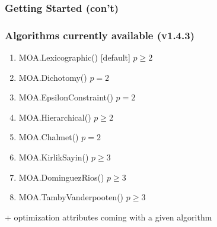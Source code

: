 \documentclass[]{beamer}
\begin{document}
\begin{frame}
  \frametitle{Getting Started (con't)}
\vspace{3mm}

\begin{center}
\end{center}

\end{frame}

% 
%

\begin{frame}
  \frametitle{Algorithms currently available (v1.4.3)}


\begin{enumerate}
\item     MOA.Lexicographic() [default]  \hfill $p \ge 2$
\item     MOA.Dichotomy()   \hfill $p=2$
\item     MOA.EpsilonConstraint() \hfill $p=2$

\medskip

\item     MOA.Hierarchical() \hfill $p \ge 2$
\item     MOA.Chalmet() \hfill $p=2$

\pause
\medskip

\item     MOA.KirlikSayin() \hfill $p \ge 3$
\item     MOA.DominguezRios() \hfill $p \ge 3$
\item     MOA.TambyVanderpooten() \hfill $p \ge 3$
\end{enumerate}
\vspace{6mm}
\pause

\noindent
{+ optimization attributes coming with a given algorithm}

\end{frame}
\end{document}
